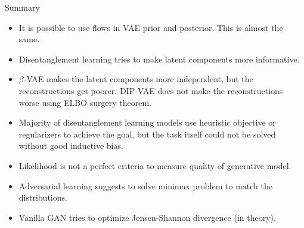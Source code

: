 \begin{frame}{Summary}
	\begin{itemize}
		\item It is possible to use flows in VAE prior and posterior. This is almost the same. 
		\vfill
		\item Disentanglement learning tries to make latent components more informative.
		\vfill
		\item $\beta$-VAE makes the latent components more independent, but the reconstructions get poorer. DIP-VAE does not make the reconstructions worse using ELBO surgery theorem.
		\vfill
		\item Majority of disentanglement learning models use heuristic objective or regularizers to achieve the goal, but the task itself could not be solved without good inductive bias.
		\vfill
		\item Likelihood is not a perfect criteria to measure quality of generative model.
		\vfill		
		\item Adversarial learning suggests to solve minimax problem to match the distributions.
		\vfill
		\item Vanilla GAN tries to optimize Jensen-Shannon divergence (in theory).
	\end{itemize}
\end{frame}
 